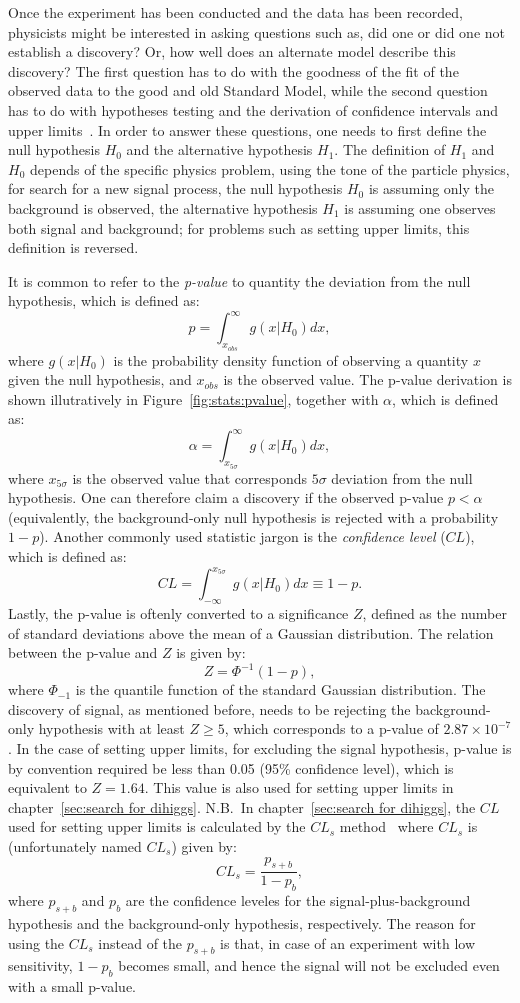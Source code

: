 Once the experiment has been conducted and the data has been recorded, 
physicists might be interested in asking questions such as,
did one or did one not establish a discovery? Or,
how well does an alternate model describe this discovery?
The first question has to do with the goodness of the fit of the 
observed data to the good and old Standard Model,
while the second question has to do with hypotheses testing and the derivation of 
confidence intervals and upper limits~\cite{Stats-for-pedestrian}.
In order to answer these questions, one needs to first define the null hypothesis $H_0$ and
the alternative hypothesis $H_1$.
The definition of $H_1$ and $H_0$ depends of the specific physics problem, using the tone
of the particle physics, for search for a new signal process, the null hypothesis $H_0$ is 
assuming only the background is observed, the alternative hypothesis $H_1$ is assuming 
one observes both signal and background; for problems such as setting upper limits,
this definition is reversed.

It is common to refer to the \textit{p-value} to quantity the deviation from the null hypothesis, 
which is defined as:
\[
p = \int_{x_{obs}}^\infty g(x|H_0) dx,
\]
where $g(x|H_0)$ is the probability density function of observing a quantity
$x$ given the null hypothesis, and $x_{obs}$ is the observed value. The p-value derivation 
is shown illutratively in Figure~\ref{fig:stats:pvalue}, together with $\alpha$, 
which is defined as:
\[
\alpha = \int_{x_{5\sigma}}^\infty g(x|H_0) dx,  
\]
where $x_{5\sigma}$ is the observed value that corresponds $5\sigma$ deviation 
from the null hypothesis. 
One can therefore claim a discovery if the observed p-value $p < \alpha$ (equivalently, 
the background-only null hypothesis is rejected with a probability $1-p$).
Another commonly used statistic jargon is the \textit{confidence level} ($CL$),
which is defined as:
\[
CL   = \int_{ -\infty}^{x_{5\sigma}} g(x|H_0) dx \equiv 1- p .
\]
Lastly, the p-value is oftenly converted to a significance $Z$, 
defined as the number of standard deviations above the mean of a Gaussian distribution.
The relation between the p-value and $Z$ is given by:
\[
Z=\Phi^{-1} (1-p),
\]
where $\Phi_{-1}$ is the quantile function of the standard Gaussian distribution.
The discovery of signal, as mentioned before, needs to be rejecting the background-only hypothesis
with at least $Z \ge 5$, which corresponds to a p-value of $2.87 \times 10^{-7}$.
In the case of setting upper limits, for excluding the signal hypothesis, p-value is by convention 
required be less than 0.05 (95\% confidence level), which is equivalent to $Z = 1.64$.
This value is also used for setting upper limits in chapter~\ref{sec:search for dihiggs}.
N.B.\ In chapter~\ref{sec:search for dihiggs}, 
the $CL$ used for setting upper limits is calculated by the $CL_s$ method~\cite{CLs}
where $CL_s$ is (unfortunately named $CL_s$) given by:
\[
    CL_s   =  \frac{p_{s+b}}{1-p_b},
\]
where $p_{s+b}$ and $p_b$ are the confidence leveles for the signal-plus-background hypothesis
and the background-only hypothesis, respectively. 
The reason for using the $CL_s$ instead of the $p_{s+b}$ is that, in case of an experiment 
with low sensitivity, $1-p_b$ becomes small, and hence the signal will not 
be excluded even with a small p-value. 

